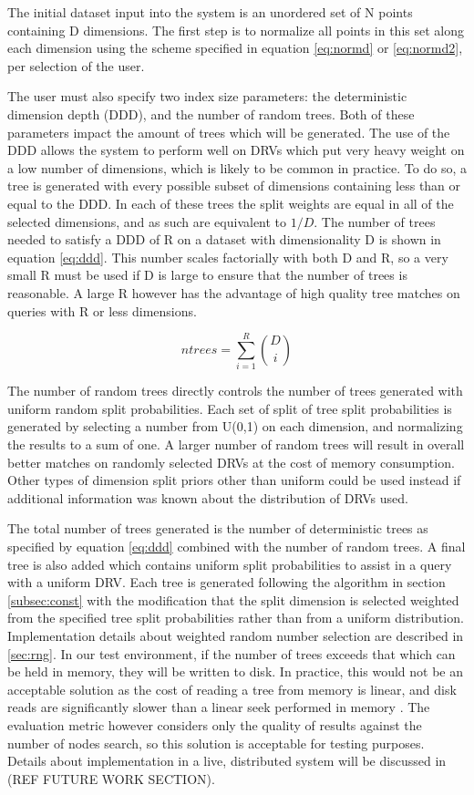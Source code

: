The initial dataset input into the system is an unordered set of N points containing D dimensions.  The first step is to normalize all points in this set along each dimension using the scheme specified in equation \ref{eq:normd} or \ref{eq:normd2}, per selection of the user.

The user must also specify two index size parameters: the deterministic dimension depth (DDD), and the number of random trees.  Both of these parameters impact the amount of trees which will be generated.  The use of the DDD allows the system to perform well on DRVs which put very heavy weight on a low number of dimensions, which is likely to be common in practice.  To do so, a tree is generated with every possible subset of dimensions containing less than or equal to the DDD.  In each of these trees the split weights are equal in all of the selected dimensions, and as such are equivalent to $1/D$.  The number of trees needed to satisfy a DDD of R on a dataset with dimensionality D is shown in equation \ref{eq:ddd}.  This number scales factorially with both D and R, so a very small R must be used if D is large to ensure that the number of trees is reasonable.  A large R however has the advantage of high quality tree matches on queries with R or less dimensions.

\begin{equation}
\label{eq:ddd}
ntrees = \sum\limits_{i=1}^R {D \choose i}
\end{equation}

The number of random trees directly controls the number of trees generated with uniform random split probabilities.  Each set of split of tree split probabilities is generated by selecting a number from U(0,1) on each dimension, and normalizing the results to a sum of one.  A larger number of random trees will result in overall better matches on randomly selected DRVs at the cost of memory consumption.  Other types of dimension split priors other than uniform could be used instead if additional information was known about the distribution of DRVs used.

The total number of trees generated is the number of deterministic trees as specified by equation \ref{eq:ddd} combined with the number of random trees.  A final tree is also added which contains uniform split probabilities to assist in a query with a uniform DRV.  Each tree is generated following the algorithm in section \ref{subsec:const} with the modification that the split dimension is selected weighted from the specified tree split probabilities rather than from a uniform distribution.  Implementation details about weighted random number selection are described in \ref{sec:rng}.  In our test environment, if the number of trees exceeds that which can be held in memory, they will be written to disk.  In practice, this would not be an acceptable solution as the cost of reading a tree from memory is linear, and disk reads are significantly slower than a linear seek performed in memory \citep{ousterhout1989beating}.  The evaluation metric however considers only the quality of results against the number of nodes search, so this solution is acceptable for testing purposes.  Details about implementation in a live, distributed system will be discussed in (REF FUTURE WORK SECTION).

